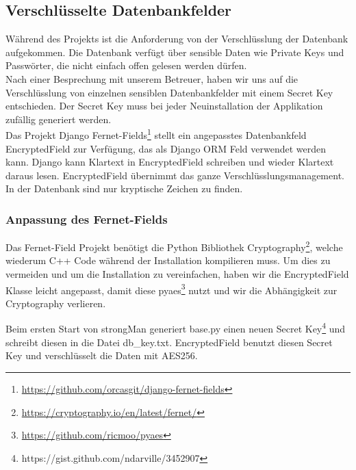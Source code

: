 \subsection{Verschlüsselte Datenbankfelder}
Während des Projekts ist die Anforderung von der Verschlüsslung der Datenbank aufgekommen. Die Datenbank verfügt über sensible Daten wie Private Keys und Passwörter, die nicht einfach offen gelesen werden dürfen.\\


Nach einer Besprechung mit unserem Betreuer, haben wir uns auf die Verschlüsslung von einzelnen sensiblen Datenbankfelder mit einem Secret Key entschieden. Der Secret Key muss bei jeder Neuinstallation der Applikation zufällig generiert werden.\\


Das Projekt  Django Fernet-Fields\footnote{\url{https://github.com/orcasgit/django-fernet-fields}} stellt ein angepasstes Datenbankfeld EncryptedField zur Verfügung, das als Django ORM Feld verwendet werden kann. Django kann Klartext in EncryptedField schreiben und wieder Klartext daraus lesen. EncryptedField übernimmt das ganze Verschlüsslungsmanagement. In der Datenbank sind nur kryptische Zeichen zu finden.

\subsubsection{Anpassung des Fernet-Fields}
Das Fernet-Field Projekt benötigt die Python Bibliothek Cryptography\footnote{\url{https://cryptography.io/en/latest/fernet/}}, welche wiederum C++ Code während der Installation kompilieren muss. Um dies zu vermeiden und um die Installation zu vereinfachen, haben wir die EncryptedField Klasse leicht angepasst, damit diese pyaes\footnote{\url{https://github.com/ricmoo/pyaes}} nutzt und wir die Abhängigkeit zur Cryptography verlieren.

Beim ersten Start von strongMan generiert base.py einen neuen Secret Key\footnote{https://gist.github.com/ndarville/3452907} und schreibt diesen in die Datei db\_key.txt.
EncryptedField benutzt diesen Secret Key und verschlüsselt die Daten mit AES256.